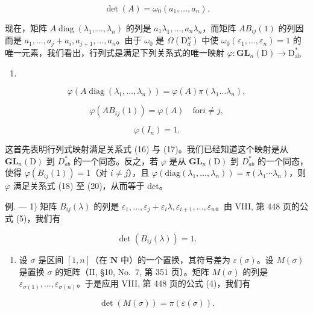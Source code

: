 \[
\det (A) = \omega_ {0} (a _ {1}, \dots , a _ {n}).
\]

现在，矩阵 \(A \operatorname{diag}(\lambda_1, \ldots, \lambda_n)\) 的列是 \(a_1\lambda_1, \ldots, a_n\lambda_n\)，而矩阵 \(AB_{ij}(1)\) 的列因而是 \(a_1, \ldots, a_j + a_i, a_{j+1}, \ldots, a_n\)。由于 \(\omega_0\) 是 \(\Omega(\mathrm{D}_d^n)\) 中使 \(\omega_0(\varepsilon_1, \ldots, \varepsilon_n) = 1\) 的唯一元素，我们看出，行列式是满足下列关系式的唯一映射 \(\varphi: \mathbf{GL}_n(\mathrm{D}) \to \mathrm{D}_{\mathrm{ab}}^*\)

\begin{enumerate}
\def\labelenumi{(\arabic{enumi})}
\setcounter{enumi}{17}
\tightlist
\item
\end{enumerate}

\[
\varphi (A \operatorname{diag} (\lambda_ {1}, \ldots , \lambda_ {n})) = \varphi (A) \pi (\lambda_ {1} \dots \lambda_ {n}),\tag{19}
\]

\[
\varphi (A B _ {i j} (1)) = \varphi (A) \quad \mathrm{for} i \neq j,\tag{20}
\]

\[
\varphi (I _ {n}) = 1.
\]

这首先表明行列式映射满足关系式 (16) 与 (17)。我们已经知道这个映射是从 \(\mathbf{GL}_{n}(\mathrm{D})\) 到 \(D_{ab}^{*}\) 的一个同态。反之，若 \(\varphi\) 是从 \(\mathbf{GL}_{n}(\mathrm{D})\) 到 \(D_{ab}^{*}\) 的一个同态，使得 \(\varphi(B_{ij}(1)) = 1\)（对 \(i \neq j\)），且 \(\varphi(\text{diag}(\lambda_1, \ldots, \lambda_n)) = \pi(\lambda_1 \cdots \lambda_n)\)，则 \(\varphi\) 满足关系式 (18) 至 (20)，从而等于 det。

例. --- 1) 矩阵 \(B_{ij}(\lambda)\) 的列是 \(\varepsilon_1, \ldots, \varepsilon_j + \varepsilon_i \lambda, \varepsilon_{i+1}, \ldots, \varepsilon_n\)。由 VIII, 第 448 页的公式 (5)，我们有

\[
\det (B _ {i j} (\lambda)) = 1.\tag{21}
\]

\begin{enumerate}
\def\labelenumi{\arabic{enumi})}
\setcounter{enumi}{1}
\tightlist
\item
  设 \(\sigma\) 是区间 \([1,n]\)（在 \(\mathbf{N}\) 中）的一个置换，其符号差为 \(\varepsilon(\sigma)\)。设 \(M(\sigma)\) 是置换 \(\sigma\) 的矩阵（II, §10, No.~7, 第 351 页）。矩阵 \(M(\sigma)\) 的列是 \(\varepsilon_{\sigma(1)},\ldots,\varepsilon_{\sigma(n)}\)。于是应用 VIII, 第 448 页的公式 (4)，我们有
\end{enumerate}

\[
\det (M (\sigma)) = \pi (\varepsilon (\sigma)).\tag{22}
\]

